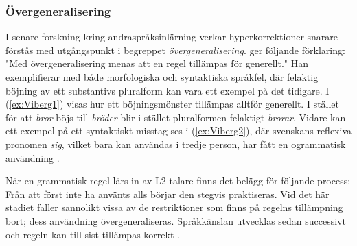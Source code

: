 \documentclass[12pt,a4paper]{article}
\begin{document}
\begin{exe}
\end{exe}

\subsubsection{Övergeneralisering}
\label{subsec:Bakgrund: Språkfel: Övergeneralisering}
I senare forskning kring andraspråksinlärning verkar hyperkorrektioner snarare förstås med utgångspunkt i begreppet \emph{övergeneralisering}. \textcite[33]{viberg1987} ger följande förklaring: "Med övergeneralisering menas att en regel tillämpas för generellt." Han exemplifierar med både morfologiska och syntaktiska språkfel, där felaktig böjning av ett substantivs pluralform kan vara ett exempel på det tidigare. I (\ref{ex:Viberg1}) visas hur ett böjningsmönster tillämpas alltför generellt. I stället för att \emph{bror} böjs till \emph{bröder} blir i stället pluralformen felaktigt \emph{brorar}. Vidare kan ett exempel på ett syntaktiskt misstag ses i (\ref{ex:Viberg2}), där svenskans reflexiva pronomen \emph{sig}, vilket bara kan användas i tredje person, har fått en ogrammatisk användning \autocite{viberg1987}.

\begin{exe}
\ex
\begin{xlist}
\end{xlist}
\end{exe}

När en grammatisk regel lärs in av L2-talare finns det belägg för följande process: Från att först inte ha använts alls börjar den stegvis praktiseras. Vid det här stadiet faller sannolikt vissa av de restriktioner som finns på regelns tillämpning bort; dess användning övergeneraliseras. Språkkänslan utvecklas sedan successivt och regeln kan till sist tillämpas korrekt \autocite{viberg1987}.
\end{document}
